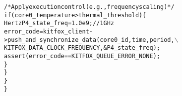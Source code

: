 {\begin{alltt}
            /* Apply execution control (e.g., frequency scaling) */
            if(core0_temperature > thermal_threshold) \{
                Hertz P4_state_freq = 1.0e9; // 1GHz
                error_code = kitfox_client->push_and_synchronize_data(core0_id, time, period,\(\backslash\)
                             KITFOX_DATA_CLOCK_FREQUENCY, &P4_state_freq);
                assert(error_code == KITFOX_QUEUE_ERROR_NONE);
            \}
        \}
    \}
\}
\end{alltt}}

